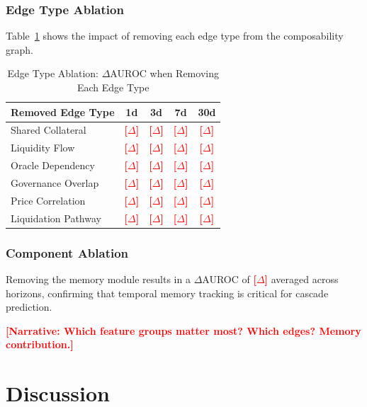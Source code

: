 \documentclass[journal]{IEEEtran}
\newcommand{\TODO}[1]{\textcolor{red}{\textbf{[#1]}}}
\begin{document}
\subsubsection{Edge Type Ablation}

Table~\ref{tab:ablation_edge} shows the impact of removing each edge type from the composability graph.

\begin{table}[!t]
\caption{Edge Type Ablation: $\Delta$AUROC when Removing Each Edge Type}
\label{tab:ablation_edge}
\centering
\footnotesize
\begin{tabular}{lcccc}
\toprule
\textbf{Removed Edge Type} & \textbf{1d} & \textbf{3d} & \textbf{7d} & \textbf{30d} \\
\midrule
Shared Collateral & \TODO{$\Delta$} & \TODO{$\Delta$} & \TODO{$\Delta$} & \TODO{$\Delta$} \\
Liquidity Flow & \TODO{$\Delta$} & \TODO{$\Delta$} & \TODO{$\Delta$} & \TODO{$\Delta$} \\
Oracle Dependency & \TODO{$\Delta$} & \TODO{$\Delta$} & \TODO{$\Delta$} & \TODO{$\Delta$} \\
Governance Overlap & \TODO{$\Delta$} & \TODO{$\Delta$} & \TODO{$\Delta$} & \TODO{$\Delta$} \\
Price Correlation & \TODO{$\Delta$} & \TODO{$\Delta$} & \TODO{$\Delta$} & \TODO{$\Delta$} \\
Liquidation Pathway & \TODO{$\Delta$} & \TODO{$\Delta$} & \TODO{$\Delta$} & \TODO{$\Delta$} \\
\bottomrule
\end{tabular}
\end{table}

\subsubsection{Component Ablation}
Removing the memory module results in a $\Delta$AUROC of \TODO{$\Delta$} averaged across horizons, confirming that temporal memory tracking is critical for cascade prediction.

\TODO{Narrative: Which feature groups matter most? Which edges? Memory contribution.}


\section{Discussion}
\end{document}
